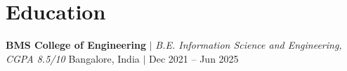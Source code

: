 \section{Education}
  \resumeSubHeadingListStart
    \resumeProjectHeading
      {\textbf{BMS College of Engineering} $|$ \emph{B.E. Information Science and Engineering, CGPA 8.5/10}}
      {Bangalore, India $|$ Dec 2021 -- Jun 2025}
  \resumeSubHeadingListEnd
  \vspace{-6pt}
